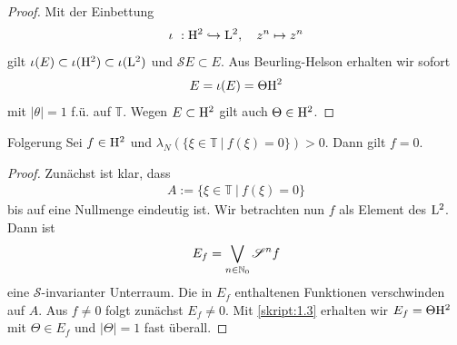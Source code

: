 \begin{proof}
Mit der Einbettung 
\begin{align*}
\iota \ : \mathrm{H}^2 \hookrightarrow \mathrm{L}^2, \quad 
z^n \mapsto z^n
\end{align*}
gilt $\iota(E) \subset \iota(\mathrm{H}^2) \subset \iota(\mathrm{L}^2)$ und $\mathscr{S} E  \subset E$.
Aus Beurling-Helson erhalten wir sofort
\begin{align*}
E = \iota(E) = \Theta \mathrm{H}^2
\end{align*}
mit $|\theta | = 1$ f.ü. auf $\mathbb{T}$.
Wegen $E \subset \mathrm{H}^2$ gilt auch $\Theta \in \mathrm{H}^2$.
\end{proof}


\begin{genericthm}{Folgerung}\label{skript:1.4}
Sei $f \in \mathrm{H}^2$ und $\lambda_N( \lbrace \xi \in \mathbb{T}\ | \ f(\xi) = 0 \rbrace) > 0$.
Dann gilt $f = 0$.
\end{genericthm}

\begin{proof}
Zunächst ist klar, dass
\begin{align*}
A:=\lbrace \xi \in \mathbb{T}\ | \ f(\xi) = 0 \rbrace
\end{align*}
bis auf eine Nullmenge eindeutig ist. Wir betrachten nun $f$ als Element des $\mathrm{L}^2$.
Dann ist 
\begin{align*}
E_f = \bigvee_{n \in \mathbb{N}_0} \mathscr{S}^n f
\end{align*}
eine $\mathscr{S}$-invarianter Unterraum.
Die in $E_f$ enthaltenen Funktionen verschwinden auf $A$.
Aus $f \neq 0$ folgt zunächst $E_f \neq {0}$.
Mit \ref{skript:1.3} erhalten wir 
$E_f = \Theta \mathrm{H}^2$ mit $\Theta \in E_f$ und $|\Theta | = 1$ fast überall.
\end{proof}